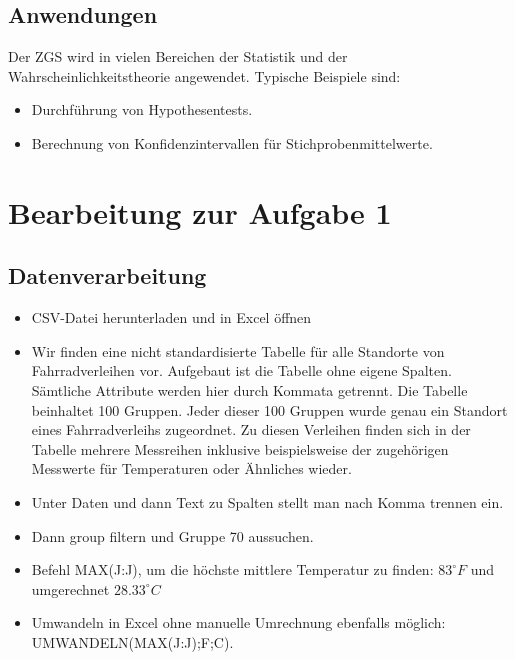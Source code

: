 \documentclass{article}
\begin{document}
\subsection{Anwendungen}
Der ZGS wird in vielen Bereichen der Statistik und der Wahrscheinlichkeitstheorie angewendet. Typische Beispiele sind:
\begin{itemize}
    \item Durchführung von Hypothesentests.
    \item Berechnung von Konfidenzintervallen für Stichprobenmittelwerte.
\end{itemize}



\newpage
\section{Bearbeitung zur Aufgabe 1}
\subsection{Datenverarbeitung}
\begin{itemize}
    \item CSV-Datei herunterladen und in Excel öffnen
    \item Wir finden eine nicht standardisierte Tabelle für alle Standorte von Fahrradverleihen vor. Aufgebaut ist die Tabelle ohne eigene Spalten. Sämtliche Attribute werden hier durch Kommata getrennt. Die Tabelle beinhaltet 100 Gruppen. Jeder dieser 100 Gruppen wurde genau ein Standort eines Fahrradverleihs zugeordnet. Zu diesen Verleihen finden sich in der Tabelle mehrere Messreihen inklusive beispielsweise der zugehörigen Messwerte für Temperaturen oder Ähnliches wieder.
    \item Unter \dq Daten\dq{} und dann \dq Text zu Spalten\dq{} stellt man nach Komma trennen ein.
    \item Dann \dq group\dq{} filtern und Gruppe 70 aussuchen.
    \item Befehl \dq MAX(J:J)\dq, um die höchste mittlere Temperatur zu finden: ${83}^\circ F$ und umgerechnet ${28.33}^\circ C$
    \item Umwandeln in Excel ohne manuelle Umrechnung ebenfalls möglich: \\UMWANDELN(MAX(J:J);\dq F\dq;\dq C\dq).
\end{itemize}
\newpage
\end{document}
